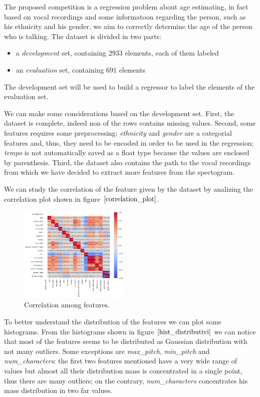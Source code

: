 The proposed competition is a regression problem about age estimating, in fact based on vocal recordings and some informatoon regarding the person, such as his ethnicity and his gender, we aim to correctly determine the age of the person who is talking.
The dataset is divided in two parts:
\begin{itemize}
    \item a \emph{development} set, containing $2933$ elements, each of them labeled  
    \item an \emph{evaluation} set, containing $691$ elements
\end{itemize}
The development set will be used to build a regressor to label the elements of the evaluation set.

We can make some considerations based on the development set. First, the dataset is complete, indeed non of the rows contains missing values. 
Second, some features requires some preprocessing: \emph{ethnicity} and \emph{gender} are a categorial features and, thus, they need to be encoded in order to be used in the regression; \emph{tempo} is not automatically saved as a float type because the values are enclosed by parenthesis.
Third, the dataset also contains the path to the vocal recordings from which we have decided to extract more features from the spectogram.

We can study the correlation of the feature given by the dataset by analizing the correlation plot shown in figure $\eqref{correlation_plot}$.
\begin{figure}
    \includegraphics[width = 0.47\textwidth]{img/correlation_plot.png}
    \caption{Correlation among features.}
    \label{correlation_plot}
\end{figure}

To better understand the distribution of the features we can plot some histograms.
From the histograms shown in figure $\eqref{hist_distributivi}$ we can notice that most of the features seems to be distributed as Gaussian distribution with not many outliers. 
Some exceptions are \textit{max\_pitch}, \textit{min\_pitch} and \textit{num\_characters}: the first two features mentioned have a very wide range of values but almost all their distribution mass is concentrated in a single point, thus there are many outliers; on the contrary, \textit{num\_characters} concentrates his mass distribution in two far values.

